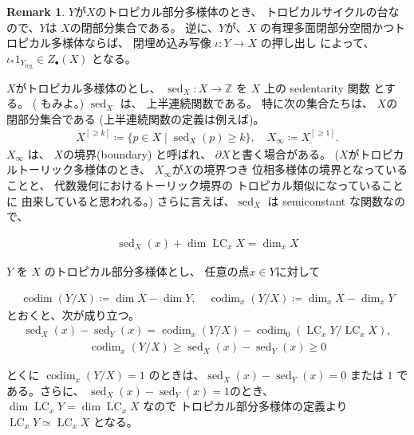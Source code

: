 \documentclass[a4paper,dvipdfmx,reqno,12pt]{amsart}
\theoremstyle{definition}
\newtheorem{remark}[theorem]{Remark}
\newcommand{\deq}{\coloneqq}
\newcommand{\opn}[1]{\operatorname{#1}}
\numberwithin{equation}{section}
\begin{document}
\begin{remark}
$Y$が$X$のトロピカル部分多様体のとき、
トロピカルサイクルの台なので、$Y$は
$X$の閉部分集合である。
逆に、$Y$が、$X$
の有理多面閉部分空間かつトロピカル多様体ならば、
閉埋め込み写像 $\iota\colon Y\to X$ 
の押し出し
\cite[]{demedrano2023chern}
によって、$\iota_*1_{Y_{\mathrm{reg}}}\in Z_{\bullet}(X)$
となる。
\end{remark}

$X$がトロピカル多様体のとし、
$\opn{sed}_X\colon 
X\to \mathbb{Z}$ を
$X$ 上の sedentarity 関数
\cite[Definition 7.2.6]{mikhalkin2018tropical}
とする。
(\cite[Definition 2.4]{demedrano2023chern}
もみよ。)
$\opn{sed}_X$ は、
上半連続関数である。
特に次の集合たちは、
$X$の閉部分集合である
(上半連続関数の定義は例えば\cite[p.287]{MR463157})。
\begin{align}
X^{[\geq k]}\deq \{p\in X\mid \opn{sed}_X(p)\geq k\},
\quad 
X_{\infty}\deq X^{[\geq 1]}.
\end{align}
$X_{\infty}$ は、
$X$の境界(boundary)
と呼ばれ、
$\partial X$と書く場合がある。
($X$がトロピカルトーリック多様体のとき、
$X_{\infty}$が$X$の境界つき
位相多様体の境界となっていることと、
代数幾何におけるトーリック境界の
トロピカル類似になっていることに
由来していると思われる。)
さらに言えば、$\opn{sed}_X$ は
semiconstant な関数なので、

\begin{align}
\opn{sed}_X(x)+\dim \opn{LC}_x X=\dim_x X
\end{align}


$Y$ を $X$ 
のトロピカル部分多様体とし、
任意の点$x\in Y$に対して

\begin{align}
\opn{codim}(Y/X)\deq \dim X -\dim Y,\quad 
\opn{codim}_x(Y/X)\deq \dim_x X -\dim_x Y
\end{align}
とおくと、次が成り立つ。
\begin{align}
\opn{sed}_X(x)-\opn{sed}_Y(x)=
\opn{codim}_x(Y/X)-\opn{codim}_0(\opn{LC}_x Y/\opn{LC}_xX),
\end{align}
\begin{align}
\opn{codim}_x(Y/X) \geq 
\opn{sed}_X(x)-\opn{sed}_Y(x)\geq 0
\end{align}

とくに $\opn{codim}_x(Y/X)=1$
のときは、$\opn{sed}_X(x)-\opn{sed}_Y(x)=0$ または
$1$ である。さらに、
$\opn{sed}_X(x)-\opn{sed}_Y(x)=1$のとき、
$\dim \opn{LC}_x Y=\dim \opn{LC}_x X$
なので トロピカル部分多様体の定義より
$\opn{LC}_x Y\simeq \opn{LC}_x X$
となる。
\end{document}
